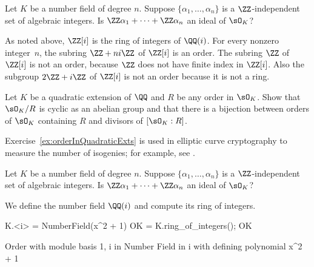 \begin{exercise} %
  Let $K$ be a number field of degree $n$.
  Suppose $\{\alpha_1,\dots,\alpha_n\}$ is a $\ZZ$-independent set of
  algebraic integers. Is $\ZZ\alpha_1 + \cdots + \ZZ\alpha_n$ an ideal
  of $\sO_K$?
\end{exercise}

As noted above, $\ZZ[i]$ is the ring of integers of $\QQ(i)$.  For every
nonzero integer~$n$, the subring $\ZZ+ni\ZZ$ of $\ZZ[i]$ is an order.
The subring $\ZZ$ of $\ZZ[i]$ is not an order, because $\ZZ$ does not
have finite index in $\ZZ[i]$.  Also the subgroup $2\ZZ + i\ZZ$ of
$\ZZ[i]$ is not an order because it is not a ring.

\begin{exercise}\label{ex:orderInQuadraticExts}
  Let $K$ be a quadratic extension of $\QQ$
  and $R$ be any order in $\sO_K$.
  Show that $\sO_K/R$ is cyclic as an abelian group
  and that there is a bijection between orders of
  $\sO_K$ containing $R$ and divisors of $[\sO_K:R]$.
\end{exercise}

\begin{remark}
  Exercise~\ref{ex:orderInQuadraticExts} is used in
  elliptic curve cryptography to measure the number
  of isogenies; for example, see \cite[\S11.2]{Koblitz2011781}.
\end{remark}

\begin{exercise} %
  Let $K$ be a number field of degree $n$. Suppose $\{\alpha_1,\dots,\alpha_n\}$ is a $\ZZ$-independent set of algebraic integers. Is $\ZZ\alpha_1 + \cdots + \ZZ\alpha_n$ an ideal of $\sO_K$?
\end{exercise}

We define the number field $\QQ(i)$ and compute its
ring of integers.
\begin{sagecode}
\begin{sagecell}
K.<i> = NumberField(x^2 + 1)
OK = K.ring_of_integers(); OK
\end{sagecell}
\begin{sageout}
Order with module basis 1, i in Number Field in i with
defining polynomial x^2 + 1
\end{sageout}
\end{sagecode} %

